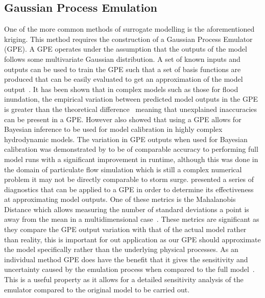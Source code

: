 \documentclass[12pt,a4paper]{article}
\begin{document}
\subsection{Gaussian Process Emulation}
\noindent
One of the more common methods of surrogate modelling is the aforementioned kriging. This method requires the construction of a Gaussian Process Emulator (GPE). A GPE operates under the assumption that the outputs of the model follows some multivariate Gaussian distribution. A set of known inputs and outputs can be used to train the GPE such that a set of basis functions are produced that can be easily evaluated to get an approximation of the model output~\cite{gpebook}. It has been shown that in complex models such as those for flood inundation, the empirical variation between predicted model outputs in the GPE is greater than the theoretical difference~\cite{floodpaper} meaning that unexplained inaccuracies can be present in a GPE. However  also showed that using a GPE allows for Bayesian inference to be used for model calibration in highly complex hydrodynamic models. The variation in GPE outputs when used for Bayesian calibration was demonstrated by  to be of comparable accuracy to performing full model runs with a significant improvement in runtime, although this was done in the domain of particulate flow simulation which is still a complex numerical problem it may not be directly comparable to storm surge.  presented a series of diagnostics that can be applied to a GPE in order to determine its effectiveness at approximating model outputs. One of these metrics is the Mahalanobis Distance which allows measuring the number of standard deviations a point is away from the mean in a multidimensional case~\cite{mahalanobis}. These metrics are significant as they compare the GPE output variation with that of the actual model rather than reality, this is important for out application as our GPE should approximate the model specifically rather than the underlying physical processes. As an individual method GPE does have the benefit that it gives the sensitivity and uncertainty caused by the emulation process when compared to the full model~\cite{gpesens}. This is a useful property as it allows for a detailed sensitivity analysis of the emulator compared to the original model to be carried out.
\end{document}
